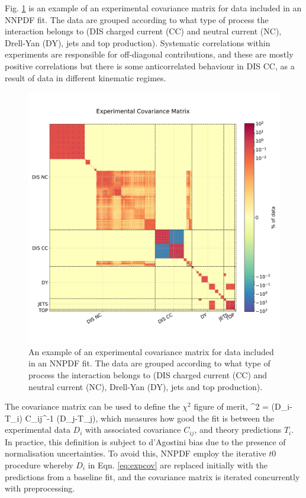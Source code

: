 Fig. \ref{fig:expcovmat} is an example of an experimental covariance matrix for data included in an NNPDF fit. The data are grouped according to what type of process the interaction belongs to (DIS charged current (CC) and neutral current (NC), Drell-Yan (DY), jets and top production). Systematic correlations within experiments are responsible for off-diagonal contributions, and these are mostly positive correlations but there is some anticorrelated behaviour in DIS CC, as a result of data in different kinematic regimes. 

\begin{figure}
\centering
\includegraphics[width=15cm]{background/exp_covmat.pdf}
\caption{An example of an experimental covariance matrix for data included in an NNPDF fit. The data are grouped according to what type of process the interaction belongs to (DIS charged current (CC) and neutral current (NC), Drell-Yan (DY), jets and top production).}
\label{fig:expcovmat}
\end{figure}

The covariance matrix can be used to define the $\chi^2$ figure of merit, 
\be
\label{eqn:chi2}
\chi^2 =  (D_i-T_i) C_{ij}^{-1} (D_j-T_j),
\ee
which measures how good the fit is between the experimental data $D_i$ with associated covariance $C_{ij}$, and theory predictions $T_i$. In practice, this definition is subject to d'Agostini bias \cite{DAgostini:1993arp} due to the presence of normalisation uncertainties. To avoid this, NNPDF employ the iterative $t0$ procedure \cite{Ball:2009qv} whereby $D_i$ in Eqn. \ref{eq:expcov} are replaced initially with the predictions from a baseline fit, and the covariance matrix is iterated concurrently with preprocessing. 


